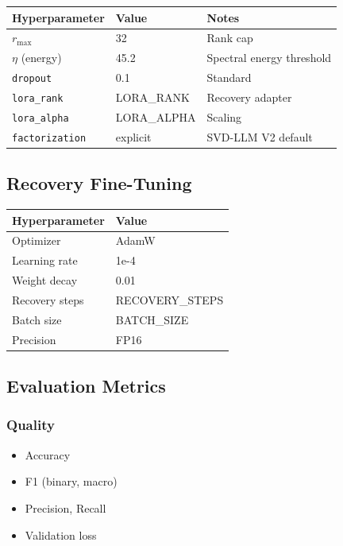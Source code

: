 \begin{table}[H]
\centering
\small
\begin{tabular}{lll}
\toprule
\textbf{Hyperparameter} & \textbf{Value} & \textbf{Notes} \\
\midrule
$r_\text{max}$ & 32 & Rank cap \\
$\eta$ (energy) & 45.2 & Spectral energy threshold \\
\texttt{dropout} & 0.1 & Standard \\
\texttt{lora\_rank} & {{LORA\_RANK}} & Recovery adapter \\
\texttt{lora\_alpha} & {{LORA\_ALPHA}} & Scaling \\
\texttt{factorization} & explicit & SVD-LLM V2 default \\
\bottomrule
\end{tabular}
\end{table}

\subsection{Recovery Fine-Tuning}

\begin{table}[H]
\centering
\small
\begin{tabular}{ll}
\toprule
\textbf{Hyperparameter} & \textbf{Value} \\
\midrule
Optimizer & AdamW \\
Learning rate & 1e-4 \\
Weight decay & 0.01 \\
Recovery steps & {{RECOVERY\_STEPS}} \\
Batch size & {{BATCH\_SIZE}} \\
Precision & FP16 \\
\bottomrule
\end{tabular}
\end{table}

\subsection{Evaluation Metrics}

\subsubsection{Quality}

\begin{itemize}
\item Accuracy
\item F1 (binary, macro)
\item Precision, Recall
\item Validation loss

\end{itemize}
